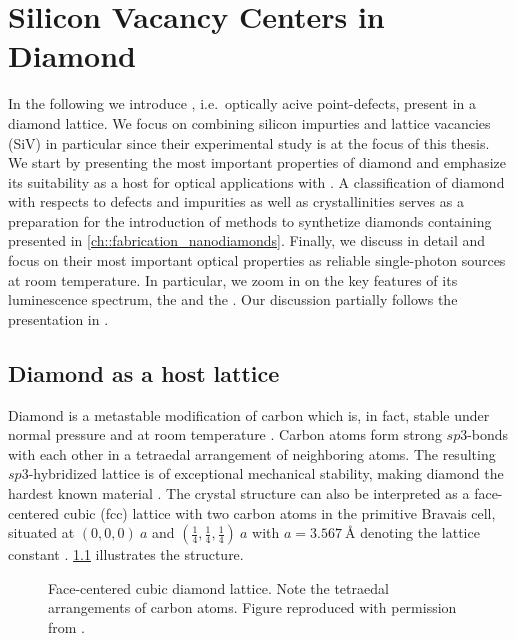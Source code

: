 
\chapter{Silicon Vacancy Centers in Diamond}	\label{ch::sivs}

  In the following we introduce \ccs, i.e.\ optically acive point-defects, present in a diamond lattice. 
  We focus on \ccs combining silicon impurties and lattice vacancies (SiV) in particular since their experimental study is at the focus of this thesis. 
  We start by presenting the most important properties of diamond and emphasize its suitability as a host for optical applications with \ccs. 
  A classification of diamond with respects to defects and impurities as well as crystallinities serves as a preparation for the introduction of methods to synthetize diamonds containing \sivs presented in \cref{ch::fabrication_nanodiamonds}. 
  Finally, we discuss \sivs in detail and focus on their most important optical properties as reliable single-photon sources at room temperature. 
  In particular, we zoom in on the key features of its luminescence spectrum, the \zpl and the \psb. 
  Our discussion partially follows the presentation in \cite{Riedrich-moller2014, neu2012, becker::thesis, Steinmetz2011}.

\section{Diamond as a host lattice}

  Diamond is a metastable modification of carbon which is, in fact, stable under normal pressure and at room temperature \cite{Bundy1989}. Carbon atoms form strong $sp3$-bonds with each other in a tetraedal arrangement of neighboring atoms. The resulting $sp3$-hybridized lattice is of exceptional mechanical stability, making diamond the hardest known material \cite{Theoretical Strength and Cleavage of Diamond}. The crystal structure can also be interpreted as a face-centered cubic (fcc) lattice with two carbon atoms in the primitive Bravais cell, situated at $(0,0,0) \ a$ and $ (\frac{1}{4}, \frac{1}{4}, \frac{1}{4}) \ a$ with $a = \SI{3.567}{\angstrom}$ denoting the lattice constant \cite{Saotome1998}. \cref{fig::diamond_lattice} illustrates the structure.

  \begin{figure}[htbp]
		\centering
		\caption[Face-centered cubic diamond lattice]{Face-centered cubic diamond lattice. Note the tetraedal arrangements of carbon atoms. Figure reproduced with permission from \cite{Riedrich-moller2014}.}
		\label{fig::diamond_lattice}
	\end{figure}

